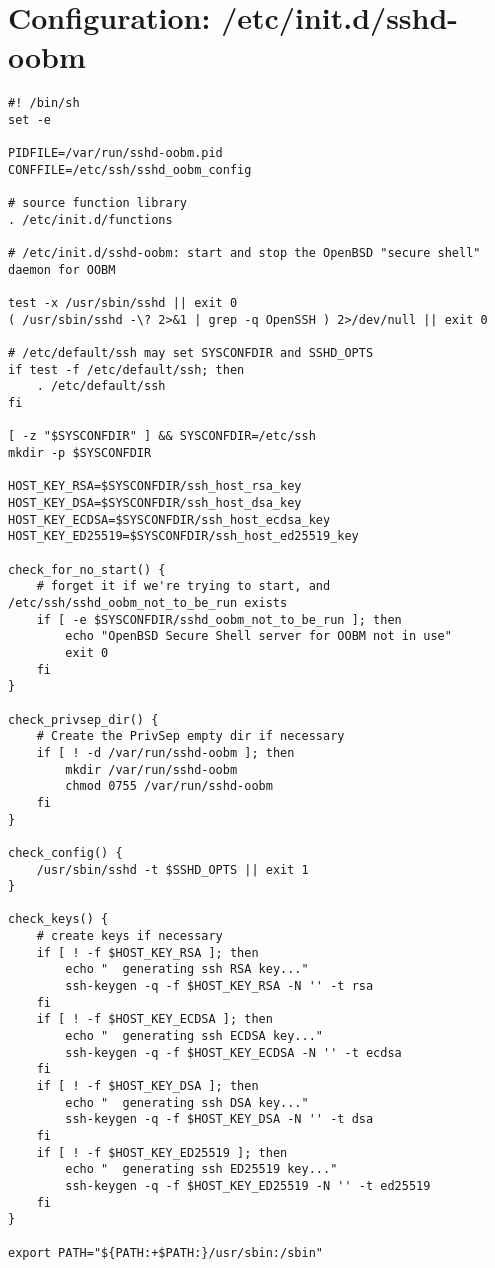 \section{Configuration: /etc/init.d/sshd-oobm}
\label{section:appendix-sshdoobminitd}
\begin{verbatim}
#! /bin/sh
set -e

PIDFILE=/var/run/sshd-oobm.pid
CONFFILE=/etc/ssh/sshd_oobm_config

# source function library
. /etc/init.d/functions

# /etc/init.d/sshd-oobm: start and stop the OpenBSD "secure shell" daemon for OOBM

test -x /usr/sbin/sshd || exit 0
( /usr/sbin/sshd -\? 2>&1 | grep -q OpenSSH ) 2>/dev/null || exit 0

# /etc/default/ssh may set SYSCONFDIR and SSHD_OPTS
if test -f /etc/default/ssh; then
    . /etc/default/ssh
fi

[ -z "$SYSCONFDIR" ] && SYSCONFDIR=/etc/ssh
mkdir -p $SYSCONFDIR

HOST_KEY_RSA=$SYSCONFDIR/ssh_host_rsa_key
HOST_KEY_DSA=$SYSCONFDIR/ssh_host_dsa_key
HOST_KEY_ECDSA=$SYSCONFDIR/ssh_host_ecdsa_key
HOST_KEY_ED25519=$SYSCONFDIR/ssh_host_ed25519_key

check_for_no_start() {
    # forget it if we're trying to start, and /etc/ssh/sshd_oobm_not_to_be_run exists
    if [ -e $SYSCONFDIR/sshd_oobm_not_to_be_run ]; then
        echo "OpenBSD Secure Shell server for OOBM not in use"
        exit 0
    fi
}

check_privsep_dir() {
    # Create the PrivSep empty dir if necessary
    if [ ! -d /var/run/sshd-oobm ]; then
        mkdir /var/run/sshd-oobm
        chmod 0755 /var/run/sshd-oobm
    fi
}

check_config() {
    /usr/sbin/sshd -t $SSHD_OPTS || exit 1
}

check_keys() {
    # create keys if necessary
    if [ ! -f $HOST_KEY_RSA ]; then
        echo "  generating ssh RSA key..."
        ssh-keygen -q -f $HOST_KEY_RSA -N '' -t rsa
    fi
    if [ ! -f $HOST_KEY_ECDSA ]; then
        echo "  generating ssh ECDSA key..."
        ssh-keygen -q -f $HOST_KEY_ECDSA -N '' -t ecdsa
    fi
    if [ ! -f $HOST_KEY_DSA ]; then
        echo "  generating ssh DSA key..."
        ssh-keygen -q -f $HOST_KEY_DSA -N '' -t dsa
    fi
    if [ ! -f $HOST_KEY_ED25519 ]; then
        echo "  generating ssh ED25519 key..."
        ssh-keygen -q -f $HOST_KEY_ED25519 -N '' -t ed25519
    fi
}

export PATH="${PATH:+$PATH:}/usr/sbin:/sbin"


\end{verbatim}
